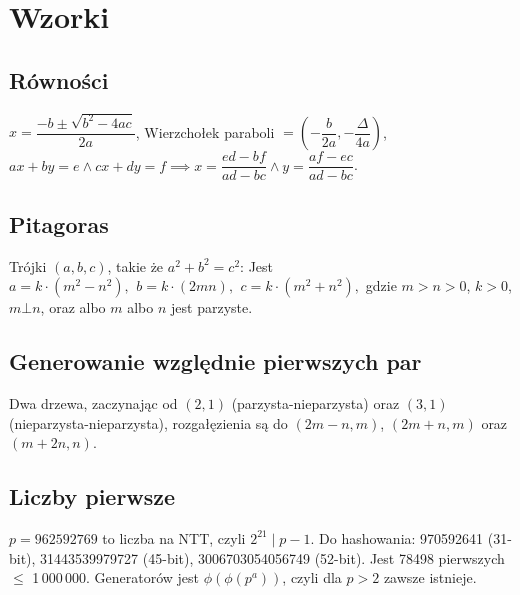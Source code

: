 \chapter{Wzorki}

\section{Równości}
$x = \dfrac{-b\pm\sqrt{b^2-4ac}}{2a}$,
Wierzchołek paraboli $= (- \dfrac{b}{2a}, - \dfrac{\Delta}{4a})$,
$ax+by=e \wedge cx+dy=f \implies
x=\dfrac{ed-bf}{ad-bc} \wedge y=\dfrac{af-ec}{ad-bc}$.

\section{Pitagoras}
Trójki $(a, b, c)$, takie że $a^2+b^2=c^2$:
 Jest $a=k\cdot (m^{2}-n^{2}),\ \,b=k\cdot (2mn),\ \,c=k\cdot (m^{2}+n^{2}),$
 gdzie $m > n > 0$, $k > 0$, $m \bot n$, oraz albo $m$ albo $n$ jest parzyste.

\section{Generowanie względnie pierwszych par}
Dwa drzewa, zaczynając od $(2, 1)$ (parzysta-nieparzysta) oraz $(3, 1)$ (nieparzysta-nieparzysta), rozgałęzienia są do $(2m-n,m)$, $(2m+n,m)$ oraz $(m+2n,n)$.

\section{Liczby pierwsze}
	$p=962592769$ to liczba na NTT, czyli $2^{21} \mid p-1$. Do hashowania:
	970592641 (31-bit), 31443539979727 (45-bit), 3006703054056749 (52-bit). 
	Jest 78498 pierwszych $\leq$ 1\,000\,000.
	Generatorów jest $\phi(\phi(p^a))$, czyli dla $p>2$ zawsze istnieje.


